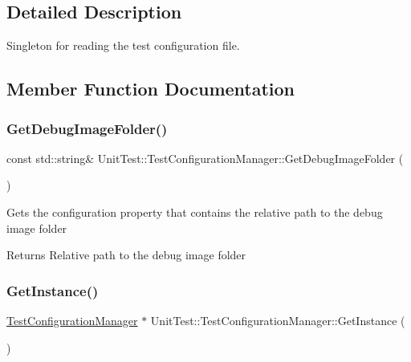 \subsection{Detailed Description}
Singleton for reading the test configuration file. 

\subsection{Member Function Documentation}
\mbox{\label{class_unit_test_1_1_test_configuration_manager_a85b5a37fb226434d0cf370875bb87b7c}} 
\subsubsection{\texorpdfstring{GetDebugImageFolder()}{GetDebugImageFolder()}}
{\footnotesize\ttfamily const std\+::string\& Unit\+Test\+::\+Test\+Configuration\+Manager\+::\+Get\+Debug\+Image\+Folder (\begin{DoxyParamCaption}{ }\end{DoxyParamCaption})\hspace{0.3cm}{\ttfamily [inline]}}

Gets the configuration property that contains the relative path to the debug image folder \begin{DoxyReturn}{Returns}
Relative path to the debug image folder 
\end{DoxyReturn}
\mbox{\label{class_unit_test_1_1_test_configuration_manager_a0d67d9b3fda9041d13927c6d2d42085b}} 
\subsubsection{\texorpdfstring{GetInstance()}{GetInstance()}}
{\footnotesize\ttfamily \mbox{\hyperlink{class_unit_test_1_1_test_configuration_manager}{Test\+Configuration\+Manager}} $\ast$ Unit\+Test\+::\+Test\+Configuration\+Manager\+::\+Get\+Instance (\begin{DoxyParamCaption}{ }\end{DoxyParamCaption})\hspace{0.3cm}{\ttfamily [static]}}


